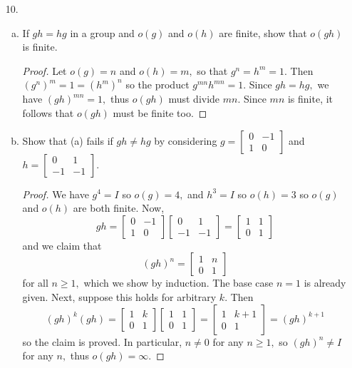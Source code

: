 \documentclass{article}
\begin{document}
\begin{itemize}
	\item[10.] 
		\begin{enumerate}[(a)]
			\item If $gh=hg$ in a group and $o(g)$ and $o(h)$ are finite, show that $o(gh)$ is finite.
				\begin{proof}
					Let $o(g)=n$ and $o(h)=m,$ so that $g^n=h^m=1.$ Then $(g^n)^m=1=(h^m)^n$ so the product $g^{mn}h^{mn}=1.$ Since $gh=hg,$ we have $(gh)^{mn}=1,$ thus $o(gh)$ must divide $mn.$ Since $mn$ is finite, it follows that $o(gh)$ must be finite too.
					
				\end{proof}

			\item Show that (a) fails if $gh\neq hg$ by considering $g=\begin{bmatrix}
					0 & -1 \\
					1 & 0
				\end{bmatrix}$ and $h=\begin{bmatrix}
					0 & 1 \\
					-1 & -1
				\end{bmatrix}.$
				\begin{proof}
					We have $g^4=I$ so $o(g)=4,$ and $h^3=I$ so $o(h)=3$ so $o(g)$ and $o(h)$ are both finite. Now, \[ gh= \begin{bmatrix}
							0 & -1 \\ 1 & 0
						\end{bmatrix}\begin{bmatrix}
							0 & 1 \\ -1 & -1
						\end{bmatrix}=\begin{bmatrix}
							1 & 1 \\ 0 & 1
					\end{bmatrix}\] and we claim that \[(gh)^n=\begin{bmatrix}
							1 & n \\
							0 & 1
					\end{bmatrix}\] for all $n\ge 1,$ which we show by induction. The base case $n=1$ is already given. Next, suppose this holds for arbitrary $k.$ Then \[(gh)^k (gh)=\begin{bmatrix}
							1 & k \\ 0 & 1
						\end{bmatrix}\begin{bmatrix}
							1 & 1 \\ 0 & 1
						\end{bmatrix} = \begin{bmatrix}
							1 & k+1 \\ 0 & 1
					\end{bmatrix}=(gh)^{k+1} \] 
					so the claim is proved. In particular, $n\neq 0$ for any $n\ge 1,$ so $(gh)^n\neq I$ for any $n,$ thus $o(gh)=\infty.$ 


\end{proof}
\end{enumerate}
\end{itemize}
\end{document}
